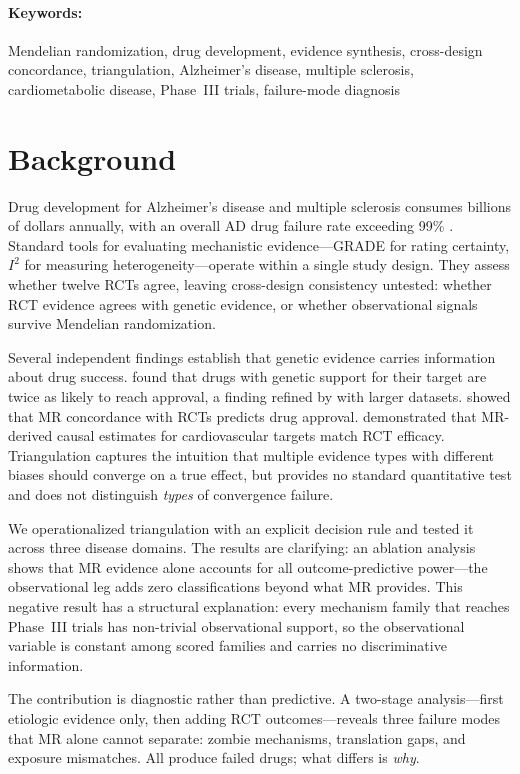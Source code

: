 \documentclass[11pt]{article}
\begin{document}
\paragraph{Keywords:} Mendelian randomization, drug development, evidence synthesis, cross-design concordance, triangulation, Alzheimer's disease, multiple sclerosis, cardiometabolic disease, Phase~III trials, failure-mode diagnosis

\section{Background}

Drug development for Alzheimer's disease and multiple sclerosis consumes billions of dollars annually, with an overall AD drug failure rate exceeding 99\% \cite{cummings2014}. Standard tools for evaluating mechanistic evidence---GRADE for rating certainty, $I^2$ for measuring heterogeneity---operate within a single study design. They assess whether twelve RCTs agree, leaving cross-design consistency untested: whether RCT evidence agrees with genetic evidence, or whether observational signals survive Mendelian randomization.

Several independent findings establish that genetic evidence carries information about drug success. \citet{nelson2015} found that drugs with genetic support for their target are twice as likely to reach approval, a finding refined by \citet{minikel2024} with larger datasets. \citet{gill2021} showed that MR concordance with RCTs predicts drug approval. \citet{ference2019} demonstrated that MR-derived causal estimates for cardiovascular targets match RCT efficacy. Triangulation \cite{lawlor2016} captures the intuition that multiple evidence types with different biases should converge on a true effect, but provides no standard quantitative test and does not distinguish \emph{types} of convergence failure.

We operationalized triangulation with an explicit decision rule and tested it across three disease domains. The results are clarifying: an ablation analysis shows that MR evidence alone accounts for all outcome-predictive power---the observational leg adds zero classifications beyond what MR provides. This negative result has a structural explanation: every mechanism family that reaches Phase~III trials has non-trivial observational support, so the observational variable is constant among scored families and carries no discriminative information.

The contribution is diagnostic rather than predictive. A two-stage analysis---first etiologic evidence only, then adding RCT outcomes---reveals three failure modes that MR alone cannot separate: zombie mechanisms, translation gaps, and exposure mismatches. All produce failed drugs; what differs is \emph{why}.
\end{document}
